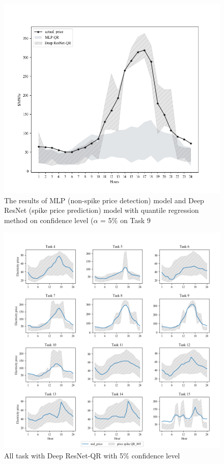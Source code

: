 \documentclass[review]{elsarticle}
\begin{document}
    \begin{figure}[H]
      \centering
      \includegraphics[width=12cm]{Task_9-compare_between_non-spike_and_spike}
      \caption{The results of MLP (non-spike price detection) model and Deep ResNet (spike price prediction) model with quantile regression method on confidence level ($\alpha$ = 5$\%$ on Task 9}
      \label{Fig:compare_spike_and_non_spike_model}
    \end{figure}

    \begin{figure}[H]
      \centering
      \includegraphics[width=15cm]{All_task_with_spike_price_QR_005}
      \caption{All task with Deep ResNet-QR with 5$\%$ confidence level}
      \label{Fig:all_task_QR_005}
    \end{figure}
\end{document}
